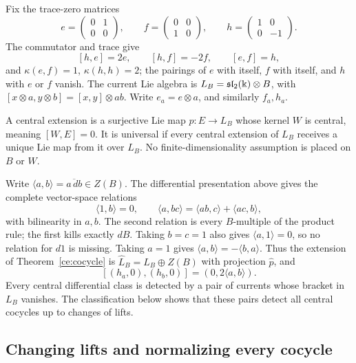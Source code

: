 Fix the trace-zero matrices
\[
 e=\begin{pmatrix}0&1\\0&0\end{pmatrix},\qquad
 f=\begin{pmatrix}0&0\\1&0\end{pmatrix},\qquad
 h=\begin{pmatrix}1&0\\0&-1\end{pmatrix}.
\]
The commutator and trace give
\begin{equation}\label{ce:uc:sl2}
 [h,e]=2e,\qquad[h,f]=-2f,\qquad[e,f]=h,
\end{equation}
and $\kappa(e,f)=1$, $\kappa(h,h)=2$; the pairings of $e$ with itself,
$f$ with itself, and $h$ with $e$ or $f$ vanish.  The current Lie
algebra is $L_B=\mathfrak{sl}_2(\Bbbk)\otimes B$, with
$[x\otimes a,y\otimes b]=[x,y]\otimes ab$.  Write
$e_a=e\otimes a$, and similarly $f_a,h_a$.

A central extension is a surjective Lie map $p:E\to L_B$ whose
kernel $W$ is central, meaning $[W,E]=0$.  It is universal if every
central extension of $L_B$ receives a unique Lie map from it over
$L_B$.  No finite-dimensionality assumption is placed on $B$ or $W$.

Write $\langle a,b\rangle=\overline{a\,db}\in Z(B)$.
The differential presentation above gives the complete vector-space
relations
\begin{equation}\label{ce:uc:symbol-relations}
 \langle1,b\rangle=0,\qquad
 \langle a,bc\rangle=\langle ab,c\rangle+\langle ac,b\rangle,
\end{equation}
with bilinearity in $a,b$.  The second relation is every $B$-multiple
of the product rule; the first kills exactly $dB$.  Taking $b=c=1$
also gives $\langle a,1\rangle=0$, so no relation for $d1$ is missing.
Taking $a=1$ gives $\langle a,b\rangle=-\langle b,a\rangle$.
Thus the extension of Theorem~\ref{ce:cocycle} is
$\widehat L_B=L_B\oplus Z(B)$ with projection $\widehat p$, and
\begin{equation}\label{ce:uc:cartan-witness}
 [(h_a,0),(h_b,0)]=(0,2\langle a,b\rangle).
\end{equation}
Every central differential class is detected by a pair of currents
whose bracket in $L_B$ vanishes.  The classification below shows that
these pairs detect all central cocycles up to changes of lifts.

\subsection{Changing lifts and normalizing every cocycle}
\label{ce:uc:normalization}

